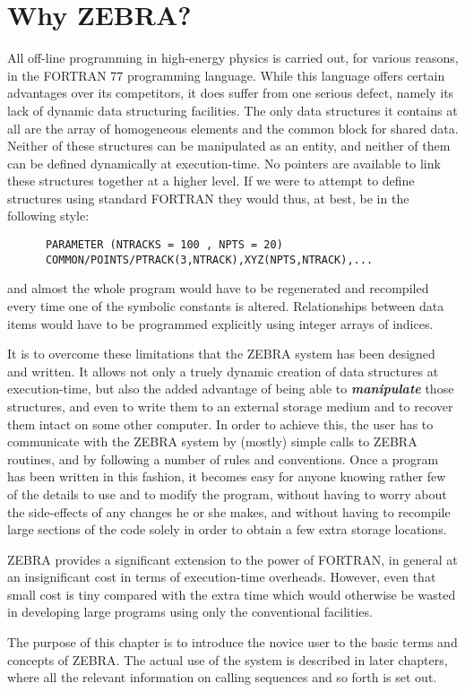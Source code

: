 \section{Why ZEBRA?}
\par All off-line programming in high-energy physics is carried out, for
various reasons, in the FORTRAN 77 programming language. While this
language offers certain advantages over its competitors, it does suffer
from one serious defect, namely its lack of dynamic data structuring
facilities. The only data structures it contains at all are the array of
homogeneous elements and the common block for shared data. Neither of
these structures can be manipulated as an entity, and neither of them
can be defined dynamically at execution-time. No pointers are available
to link these structures together at a higher level.
If we were to attempt to
define structures using standard FORTRAN they would thus, at best, be in
the following style:
\begin{verbatim}
      PARAMETER (NTRACKS = 100 , NPTS = 20)
      COMMON/POINTS/PTRACK(3,NTRACK),XYZ(NPTS,NTRACK),...
\end{verbatim}
and almost the whole program would have to be regenerated and recompiled
every time one of the symbolic constants is altered.
Relationships between data items would have to be programmed explicitly
using integer arrays of indices.
\par It is to overcome these limitations that the ZEBRA system has been
designed and written. It allows not only a truely dynamic
creation of data structures at execution-time, but also the added
advantage of being able to
{\bf\it manipulate} those structures, and even to write them to an external
storage medium and to recover them intact on some other computer.
In order to achieve this, the
user has to communicate with the ZEBRA system by (mostly) simple calls
to ZEBRA routines, and by following a number of rules and conventions.
Once a program has been written in this fashion, it becomes easy
for anyone knowing rather few of the details to use and to modify the
program, without having to worry about the side-effects of any changes
he or she makes, and without having to recompile large sections of the
code solely in order to obtain a few extra storage locations.
\par ZEBRA provides a significant extension to the power of FORTRAN, in
general at an insignificant cost in terms of execution-time overheads.
However, even that small cost is tiny compared with the extra time which
would otherwise be wasted in developing large programs using only the
conventional facilities.
\par The purpose of this chapter is to introduce the novice user to the basic
terms and concepts of ZEBRA. The actual use of the system
is described in later
chapters, where all the relevant information on calling sequences and so
forth is set out.
